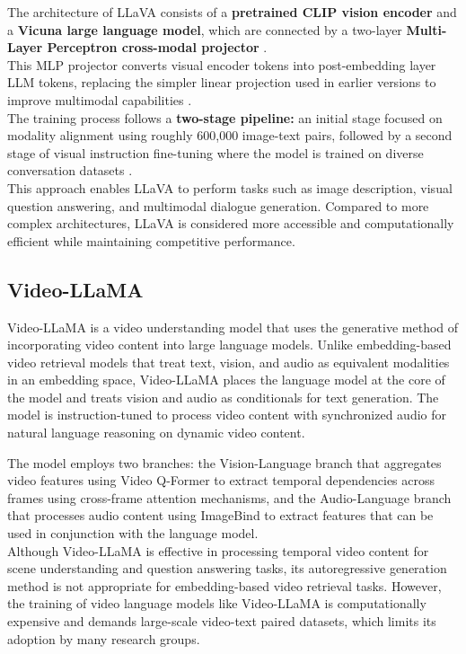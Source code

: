 \documentclass[12pt,a4paper,oneside,english]{book}
\begin{document}
The architecture of LLaVA  consists of a \textbf{pretrained CLIP  vision encoder }and a \textbf{Vicuna large language model}, which are connected by a two-layer \textbf{Multi-Layer Perceptron cross-modal projector} .\\
This MLP projector converts visual encoder tokens into post-embedding layer LLM tokens, replacing the simpler linear projection used in earlier versions to improve multimodal capabilities .\\
The training process follows a \textbf{two-stage pipeline:} an initial stage focused on modality alignment using roughly 600,000 image-text pairs, followed by a second stage of visual instruction fine-tuning where the model is trained on diverse conversation datasets .\\
This approach enables LLaVA to perform tasks such as image description, visual question answering, and multimodal dialogue generation. Compared to more complex architectures, LLaVA is considered more accessible and computationally efficient while maintaining competitive performance.

\subsection{Video-LLaMA}
\label{subsec:videollama}
Video-LLaMA \citep{zhang2023videollama} is a video understanding model that uses the generative method of incorporating video content into large language models. Unlike embedding-based video retrieval models that treat text, vision, and audio as equivalent modalities in an embedding space, Video-LLaMA places the language model at the core of the model and treats vision and audio as conditionals for text generation. The model is instruction-tuned to process video content with synchronized audio for natural language reasoning on dynamic video content.

The model employs two branches: the Vision-Language branch that aggregates video features using Video Q-Former to extract temporal dependencies across frames using cross-frame attention mechanisms, and the Audio-Language branch that processes audio content using ImageBind \citep{girdhar2023imagebindembeddingspacebind} to extract features that can be used in conjunction with the language model. 
\\Although Video-LLaMA is effective in processing temporal video content for scene understanding and question answering tasks, its autoregressive generation method is not appropriate for embedding-based video retrieval tasks.
However, the training of video language models like Video-LLaMA is computationally expensive and demands large-scale video-text paired datasets, which limits its adoption by many research groups. 
\end{document}
